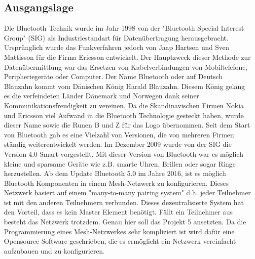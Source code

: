 
\subsection{Ausgangslage}\label{subsec:Ausgangslage}

Die Bluetooth Technik wurde im Jahr 1998 von der "Bluetooth Special Interest Group" (SIG) als Industriestandart für Datenübertragung herausgebracht. Ursprünglich wurde das Funkverfahren jedoch von Jaap Hartsen und Sven Mattisson für die Firma Ericsson entwickelt. Der Hauptzweck dieser Methode zur Datenübermittlung war das Ersetzen von Kabelverbindungen von Mobiltelefone, Peripheriegeräte oder Computer. Der Name Bluetooth oder auf Deutsch Blauzahn kommt vom Dänischen König Harald Blauzahn. Diesem König gelang es die verfeindeten Länder Dänemark und Norwegen dank seiner Kommunikationsfreudigkeit zu vereinen. Da die Skandinavischen Firmen Nokia und Ericsson viel Aufwand in die Bluetooth Technologie gesteckt haben, wurde dieser Name sowie die Runen B und Z für das Logo übernommen. Seit dem Start von Bluetooth gab es eine Vielzahl von Versionen, die von mehreren Firmen ständig weiterentwickelt werden. Im Dezember 2009 wurde von der SIG die Version 4.0 Smart vorgestellt. Mit dieser Version von Bluetooth war es möglich kleine und sparsame Geräte wie z.B. smarte Uhren, Brillen oder sogar Ringe herzustellen. Ab dem Update Bluetooth 5.0 im Jahre 2016, ist es möglich Bluetooth Komponenten in einem Mesh-Netzwerk zu konfigurieren. Dieses Netzwerk basiert auf einem "many-to-many pairing system" d.h. jeder Teilnehmer ist mit den anderen Teilnehmern verbunden. Dieses dezentralisierte System hat den Vorteil, dass es kein Master Element benötigt. Fällt ein Teilnehmer aus besteht das Netzwerk trotzdem. Genau hier soll das Projekt 5 ansetzten. Da die Programmierung eines Mesh-Netzwerkes sehr kompliziert ist wird dafür eine Opensource Software geschrieben, die es ermöglicht ein Netzwerk vereinfacht aufzubauen und zu konfigurieren. 








